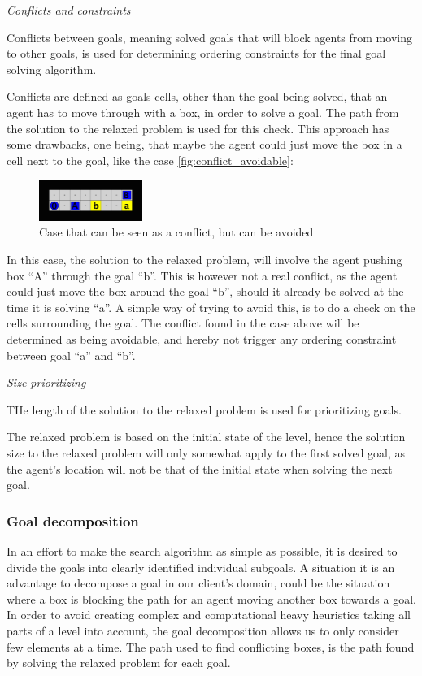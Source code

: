 \documentclass[Main]{subfiles}
\begin{document}
\textit{Conflicts and constraints}

Conflicts between goals, meaning solved goals that will block agents from moving to other goals, is used for determining ordering constraints for the final goal solving algorithm. 

Conflicts are defined as goals cells, other than the goal being solved, that an agent has to move through with a box, in order to solve a goal. The path from the solution to the relaxed problem is used for this check. This approach has some drawbacks, one being, that maybe the agent could just move the box in a cell next to the goal, like the case \autoref{fig:conflict_avoidable}:
\begin{figure}[h!]
    \centering
    \includegraphics[width=0.3\textwidth]{conflict.png}
    \caption{Case that can be seen as a conflict, but can be avoided}
    \label{fig:conflict_avoidable}
\end{figure}


In this case, the solution to the relaxed problem, will involve the agent pushing box ``A'' through the goal ``b''. This is however not a real conflict, as the agent could just move the box around the goal ``b'', should it already be solved at the time it is solving ``a''. A simple way of trying to avoid this, is to do a check on the cells surrounding the goal. 
The conflict found in the case above will be determined as being avoidable, and hereby not trigger any ordering constraint between goal ``a'' and ``b''. 


\textit{Size prioritizing} 

THe length of the solution to the relaxed problem is used for prioritizing goals. 

The relaxed problem is based on the initial state of the level, hence the solution size to the relaxed problem will only somewhat apply to the first solved goal, as the agent's location will not be that of the initial state when solving the next goal. 



\subsubsection{Goal decomposition}
In an effort to make the search algorithm as simple as possible, it is desired to divide the goals into clearly identified individual subgoals. A situation it is an advantage to decompose a goal in our client's domain, could be the situation where a box is blocking the path for an agent moving another box towards a goal. In order to avoid creating complex and computational heavy heuristics taking all parts of a level into account, the goal decomposition allows us to only consider few elements at a time. The path used to find conflicting boxes, is the path found by solving the relaxed problem for each goal.
\end{document}

